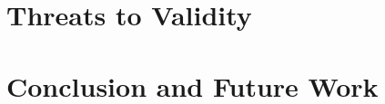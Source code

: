 \documentclass{sig-alternate}
\begin{document}
\section{Threats to Validity}
\section{Conclusion and Future Work}\label{summary}






\scriptsize
\setlength{\bibsep}{0.0pt}


%
%
\end{document}
